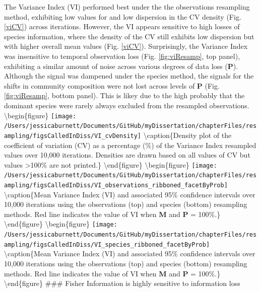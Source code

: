 \documentclass[12pt,twoside,openany]{reedthesis}
\begin{document}
The Variance Index (VI) performed best under the the observations resampling method, exhibiting low values for and low dispersion in the CV density (Fig. \ref{viCV}) across iterations. However, the VI appears sensitive to high losses of species information, where the density of the CV still exhibits low dispersion but with higher overall mean values (Fig. \ref{viCV}). Surprisingly, the Variance Index was insensitive to temporal observation loss (Fig. \ref{fig:viResamp}, top panel), exhibiting a similar amount of noise across various degrees of data loss (\(\textbf{P}\)). Although the signal was dampened under the species method, the signals for the shifts in community composition were not lost across levels of \(\textbf{P}\) (Fig. \ref{fig:viResamp}, bottom panel). This is likey due to the high probably that the dominant species were rarely always excluded from the resampled observations.
\textbackslash begin\{figure\}
\texttt{[image: /Users/jessicaburnett/Documents/GitHub/myDissertation/chapterFiles/resampling/figsCalledInDiss/VI\_cvDensity]} \textbackslash caption\{Density plot of the coefficient of variation (CV) as a percentage (\%) of the Variance Index resampled values over 10,000 iterations. Densities are drawn based on all values of CV but values \textgreater100\% are not printed.\}\label{fig:viCV}
\textbackslash end\{figure\}
\textbackslash begin\{figure\}
\texttt{[image: /Users/jessicaburnett/Documents/GitHub/myDissertation/chapterFiles/resampling/figsCalledInDiss/VI\_observations\_ribboned\_facetByProb]} \textbackslash caption\{Mean Variance Index (VI) and associated 95\% confidence intervals over 10,000 iterations using the observations (top) and species (bottom) resampling methods. Red line indicates the value of VI when \textbf{M} and \textbf{P} = 100\%.\}\label{fig:viResamp}
\textbackslash end\{figure\}
\textbackslash begin\{figure\}
\texttt{[image: /Users/jessicaburnett/Documents/GitHub/myDissertation/chapterFiles/resampling/figsCalledInDiss/VI\_species\_ribboned\_facetByProb]} \textbackslash caption\{Mean Variance Index (VI) and associated 95\% confidence intervals over 10,000 iterations using the observations (top) and species (bottom) resampling methods. Red line indicates the value of VI when \textbf{M} and \textbf{P} = 100\%.\}\label{fig:viResamp}
\textbackslash end\{figure\}
\#\#\# Fisher Information is highly sensitive to information loss\\
\end{document}
